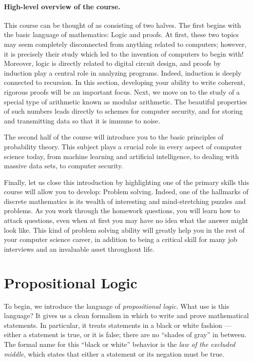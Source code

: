 \documentclass[11pt]{article}
\newcounter{thm}
\begin{document}
\paragraph{High-level overview of the course.} This course can be thought of as consisting of two halves. The first begins with the basic language of mathematics: Logic and proofs. At first, these two topics may seem completely disconnected from anything related to computers; however, it is precisely their study which led to the invention of computers to begin with! Moreover, logic is directly related to digital circuit design, and proofs by induction play a central role in analyzing programs. Indeed, induction is deeply connected to recursion. In this section, developing your ability to write coherent, rigorous proofs will be an important focus. Next, we move on to the study of a special type of arithmetic known as  modular arithmetic. The beautiful properties of such numbers leads directly to schemes for computer security, and for storing and transmitting data so that it is immune to noise.

The second half of the course will introduce you to the basic principles of probability theory. This subject plays a crucial role in every aspect of computer science today, from machine learning and artificial intelligence, to dealing with massive data sets, to computer security.

Finally, let us close this introduction by highlighting one of the primary skills this course will allow you to develop: Problem solving. Indeed, one of the hallmarks of discrete mathematics is its wealth of interesting and mind-stretching puzzles and problems. As you work through the homework questions, you will learn how to attack questions, even when at first you may have no idea what the answer might look like. This kind of problem solving ability will greatly help you in the rest of your computer science career, in addition to being a critical skill for many job interviews and an invaluable asset throughout life.

\section{Propositional Logic}\label{scn:proplogic}

To begin, we introduce the language of \emph{propositional logic}. What use is this language? It gives us a clean formalism in which to write and prove mathematical statements. In particular, it treats statements in a black or white fashion --- either a statement is true, or it is false; there are no ``shades of gray'' in between. The formal name for this ``black or white'' behavior is the \emph{law of the excluded middle}, which states that either a statement or its negation must be true.
\end{document}
